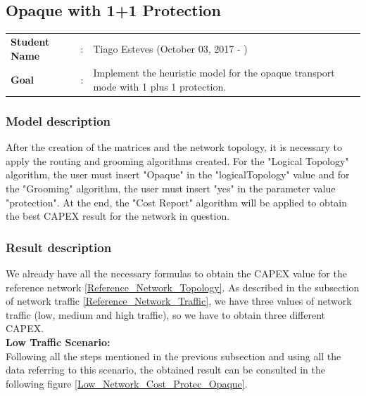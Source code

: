 \clearpage

\subsection{Opaque with 1+1 Protection}\label{heuristic_Opaque_Protection}
\begin{tcolorbox}	
\begin{tabular}{p{2.75cm} p{0.2cm} p{10.5cm}} 	
\textbf{Student Name}  &:& Tiago Esteves    (October 03, 2017 - )\\
\textbf{Goal}          &:& Implement the heuristic model for the opaque transport mode with 1 plus 1 protection.
\end{tabular}
\end{tcolorbox}

\subsubsection{Model description}

After the creation of the matrices and the network topology, it is necessary to apply the routing and grooming algorithms created. For the "Logical Topology" algorithm, the user must insert "Opaque" in the "logicalTopology" value and for the "Grooming" algorithm, the user must insert "yes" in the parameter value "protection".
At the end, the "Cost Report" algorithm will be applied to obtain the best CAPEX result for the network in question.

\subsubsection{Result description}

We already have all the necessary formulas to obtain the CAPEX value for the reference network \ref{Reference_Network_Topology}. As described in the subsection of network traffic \ref{Reference_Network_Traffic}, we have three values of network traffic (low, medium and high traffic), so we have to obtain three different CAPEX.\\

\textbf{Low Traffic Scenario:}\\

Following all the steps mentioned in the previous subsection and using all the data referring to this scenario, the obtained result can be consulted in the following figure \ref{Low_Network_Cost_Protec_Opaque}.

